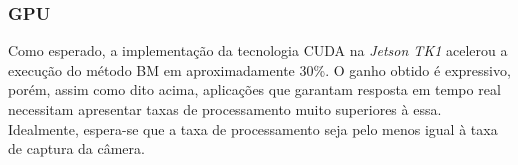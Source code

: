\subsubsection{GPU}
Como esperado, a implementação da tecnologia CUDA na \textit{Jetson TK1} acelerou a execução do método BM em aproximadamente 30\%. O ganho obtido é expressivo, porém, assim como dito acima, aplicações que garantam resposta em tempo real necessitam apresentar taxas de processamento muito superiores à essa. Idealmente, espera-se que a taxa de processamento seja pelo menos igual à taxa de captura da câmera.